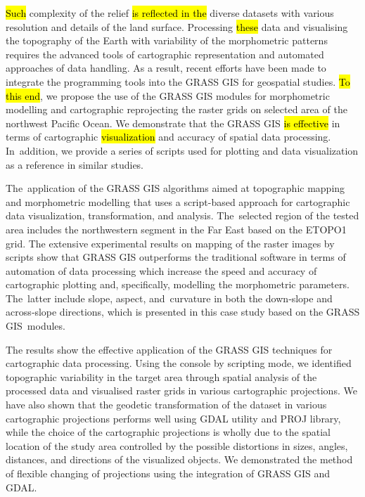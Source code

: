 \documentclass[technologies,article,accept,pdftex,moreauthors]{Definitions/mdpi}
\begin{document}
\hl{Such} complexity of the relief \hl{is reflected in the} diverse datasets with various resolution and details of the land surface. Processing \hl{these} data and visualising the topography of the Earth with variability of the morphometric patterns requires the advanced tools of cartographic representation and automated approaches of data handling. As a result, recent efforts have been made to integrate the programming tools into the GRASS GIS for geospatial studies. \hl{To this end}, we propose the use of the GRASS GIS modules for morphometric modelling and cartographic reprojecting the raster grids on selected area of the northwest Pacific Ocean. We demonstrate that the GRASS GIS \hl{is effective} in terms of cartographic \hl{visualization} and accuracy of spatial data processing. In~addition, we provide a series of scripts used for plotting and data visualization as a reference in similar studies. 

The~application of the GRASS GIS algorithms {aimed at }topographic mapping and morphometric modelling that uses a script-based approach for cartographic data visualization, transformation, and analysis. The~selected region of the tested area includes the northwestern segment{ }in the Far East {based on the} ETOPO1 grid. {The }extensive experimental results on mapping {of the }raster images by scripts{ }show that GRASS GIS outperforms the traditional software in terms of automation of data processing which increase the speed and accuracy of cartographic plotting{ and, specifically, modelling the morphometric parameters. The~latter include} slope, aspect, and~curvature in both the down‐slope and across‐slope directions, which is presented in this case study based on the GRASS GIS~modules. 

The results show the effective application of the GRASS GIS techniques for cartographic data processing. Using the console by scripting mode, we identified topographic variability in the target area through spatial analysis of the processed data and visualised raster grids in various cartographic projections. We have also shown that the geodetic transformation of the dataset in various cartographic projections performs well using GDAL utility and PROJ library, while the choice of the cartographic projections is wholly due to the spatial location of the study area controlled by the possible distortions in sizes, angles, distances, and directions of the visualized objects. We demonstrated the method of flexible changing of projections using the integration of GRASS GIS and GDAL. 
\end{document}
